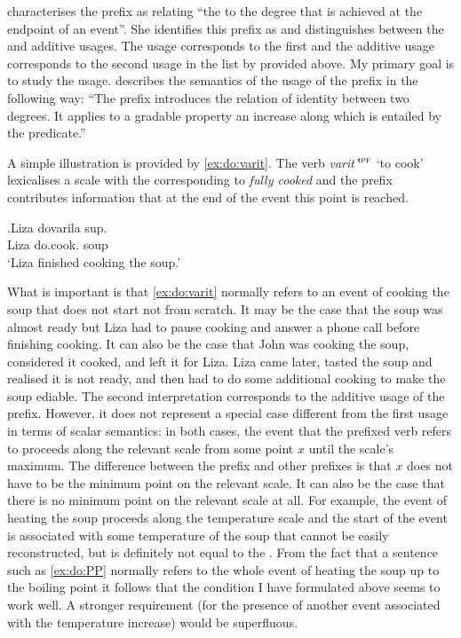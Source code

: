 \citet[70]{Kagan:book} characterises the prefix  as relating ``the  to the degree that is achieved at the endpoint of an event''. She identifies this prefix as  and distinguishes between the  and additive  usages. The  usage corresponds to the first and the additive usage corresponds to the second usage in the list by \citet{Shvedova:82} provided above. My primary goal is to study the  usage. \citet[72]{Kagan:book} describes the semantics of the  usage of the prefix  in the following way: ``The prefix introduces the relation of identity between two degrees. It applies to a gradable property an increase along which is entailed by the predicate.''

A simple illustration is provided by \ref{ex:do:varit}. The verb \textit{varit'}$^{\textsc{ipf}}$ `to cook' lexicalises a scale with the  corresponding to \textit{fully cooked} and the prefix  contributes information that at the end of the event this point is reached. 

\exg.\label{ex:do:varit}Liza dovarila sup.\\
Liza do.cook. soup\\
\trans `Liza finished cooking the soup.'

What is important is that \ref{ex:do:varit} normally refers to an event of cooking the soup that does not start not from scratch. It may be the case that the soup was almost ready but Liza had to pause cooking and answer a phone call before finishing cooking. It can also be the case that John was cooking the soup, considered it cooked, and left it for Liza. Liza came later, tasted the soup and realised it is not ready, and then had to do some additional cooking to make the soup ediable. The second interpretation corresponds to the additive usage of the prefix. However, it does not represent a special case different from the first usage in terms of scalar semantics: in both cases, the event that the prefixed verb refers to proceeds along the relevant scale from some point $x$ until the scale's maximum. The difference between the prefix  and other prefixes is that $x$ does not have to be the minimum point on the relevant scale. It can also be the case that there is no minimum point on the relevant scale at all. For example, the event of heating the soup proceeds along the temperature scale and the start of the event is associated with some temperature of the soup that cannot be easily reconstructed, but is definitely not equal to the . From the fact that a sentence such as \ref{ex:do:PP} normally refers to the whole event of heating the soup up to the boiling point it follows that the condition I have formulated above seems to work well. A stronger requirement (for the presence of another event associated with the temperature increase) would be superfluous.

